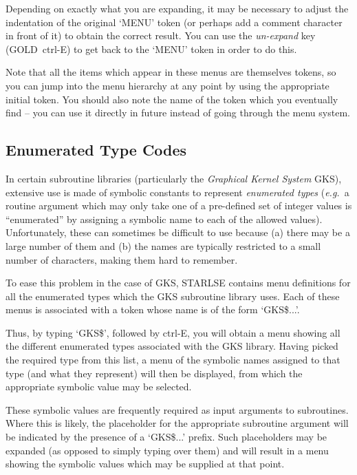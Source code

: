 Depending on exactly what you are expanding, it may be necessary to adjust 
the indentation of the original `MENU' token (or perhaps add a comment 
character in front of it) to obtain the correct result.
You can use the {\em un-expand} key (GOLD~ctrl-E) to get back to the `MENU' 
token in order to do this.

Note that all the items which appear in these menus are themselves tokens,
so you can jump into the menu hierarchy at any point by using the
appropriate initial token. 
You should also note the name of the token which you eventually find -- you
can use it directly in future instead of going through the menu system. 


\subsection{Enumerated Type Codes}

In certain subroutine libraries (particularly the {\em Graphical Kernel
System} \mbox{GKS}), extensive use is made of symbolic constants to
represent {\em enumerated types} ({\em e.g.}\ a routine argument which may
only take one of a pre-defined set of integer values is ``enumerated'' by
assigning a symbolic name to each of the allowed values). 
Unfortunately, these can sometimes be difficult to use because (a) there may
be a large number of them and (b) the names are typically restricted to a
small number of characters, making them hard to remember. 

To ease this problem in the case of GKS, \mbox{STARLSE} contains menu
definitions for all the enumerated types which the GKS subroutine library
uses. 
Each of these menus is associated with a token whose name is of the form
`GKS\$...'.

Thus, by typing `GKS\$', followed by \mbox{ctrl-E}, you will obtain a menu 
showing all the different enumerated types associated with the \mbox{GKS} 
library.
Having picked the required type from this list, a menu of the symbolic names
assigned to that type (and what they represent) will then be displayed, from
which the appropriate symbolic value may be selected. 

These symbolic values are frequently required as input arguments to
subroutines. 
Where this is likely, the placeholder for the appropriate subroutine argument 
will be indicated by the presence of a `GKS\$...' prefix.
Such placeholders may be expanded (as opposed to simply typing over them)
and will result in a menu showing the symbolic values which may be supplied
at that point. 


